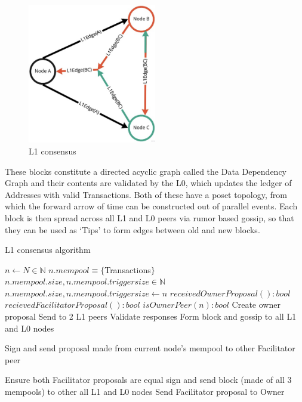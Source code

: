 \documentclass{article}
\begin{document}
\begin{figure}
\centering
\includegraphics[width=0.5\textwidth, height=0.5\textwidth]{L1-hylo}
\caption{L1 consensus}
\end{figure}

These blocks constitute a directed acyclic graph called the Data Dependency Graph and their contents are validated by the L0, which updates the ledger of Addresses with valid Transactions. Both of these have a poset topology, from which the forward arrow of time can be constructed out of parallel events. Each block is then spread across all L1 and L0 peers via rumor based gossip, so that they can be used as ‘Tips’ to form edges between old and new blocks.

\begin{algorithm}
\caption{L1 consensus algorithm}\label{alg:cap}
\begin{algorithmic}

\State $n \gets N \in \mathbb{N}$ 
\State $n.mempool \equiv \{ $Transactions$ \}$
\State $n.mempool.size, n.mempool.triggersize \in \mathbb{N}$
\State $n.mempool.size, n.mempool.triggersize \gets n$ 
\State $received Owner Proposal(): bool$
\State $recieved Facilitator Proposal(): bool$
\State $isOwnerPeer(n): bool$
		 \State Create owner proposal
		 \State Send to 2 L1 peers
		 \State Validate responses
		 \State Form block and gossip to all L1 and L0 nodes
		
			\State Sign and send proposal made from current node's mempool to other Facilitator peer
		
			\State Ensure both Facilitator proposals are equal
			\State sign and send block (made of all 3 mempools) to other all L1 and L0 nodes
		\Else
			\State Send Facilitator proposal to Owner
		\EndIf
	\EndIf
\EndWhile

\end{algorithmic}
\end{algorithm}
\end{document}
